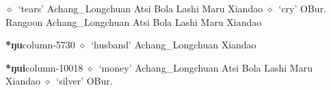          $\diamond$~`tears'
         Achang\_Longchuan 
\hspace{1ex}
         Atsi 
\hspace{1ex}
         Bola 
\hspace{1ex}
         Lashi 
\hspace{1ex}
         Maru 
\hspace{1ex}
         Xiandao 
\hspace{1ex}
         $\diamond$~`cry'
         OBur. 
\hspace{1ex}
         Rangoon 
\hspace{1ex}
         Achang\_Longchuan 
\hspace{1ex}
         Atsi 
\hspace{1ex}
         Bola 
\hspace{1ex}
         Lashi 
\hspace{1ex}
         Maru 
\hspace{1ex}
         Xiandao 
  \item {\footnotesize \textbf{*ŋu}}{\tiny column-5730}
         $\diamond$~`husband'
         Achang\_Longchuan 
\hspace{1ex}
         Xiandao 
  \item {\footnotesize \textbf{*ŋui}}{\tiny column-10018}
         $\diamond$~`money'
         Achang\_Longchuan 
\hspace{1ex}
         Atsi 
\hspace{1ex}
         Bola 
\hspace{1ex}
         Lashi 
\hspace{1ex}
         Maru 
\hspace{1ex}
         Xiandao 
\hspace{1ex}
         $\diamond$~`silver'
         OBur. 
